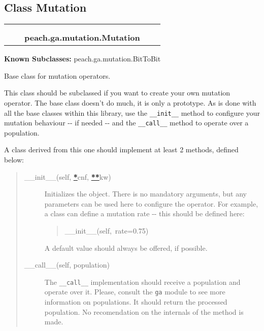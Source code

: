 
\subsection{Class Mutation}

    \label{peach:ga:mutation:Mutation}
\begin{tabular}{cccccc}
\multicolumn{2}{r}{\settowidth{\BCL}{object}\multirow{2}{\BCL}{object}}
&&
  \\\cline{3-3}
  &&\multicolumn{1}{c|}{}
&&
  \\
&&\multicolumn{2}{l}{\textbf{peach.ga.mutation.Mutation}}
\end{tabular}

\textbf{Known Subclasses:} peach.ga.mutation.BitToBit


Base class for mutation operators.

This class should be subclassed if you want to create your own mutation
operator. The base class doesn't do much, it is only a prototype. As is done
with all the base classes within this library, use the \texttt{\_\_init\_\_} method
to configure your mutation behaviour -{}- if needed -{}- and the \texttt{\_\_call\_\_}
method to operate over a population.

A class derived from this one should implement at least 2 methods, defined
below:
%
\begin{quote}
%
\begin{description}
\item[{\_\_init\_\_(self, %
\hyperlink{id1}{\textbf{\color{red}*}}cnf, %
\hyperlink{id3}{\textbf{\color{red}**}}kw)}] \leavevmode 
Initializes the object. There is no mandatory arguments, but any
parameters can be used here to configure the operator. For example, a
class can define a mutation rate -{}- this should be defined here:
%
\begin{quote}{\ttfamily \raggedright \noindent
\_\_init\_\_(self,~rate=0.75)
}
\end{quote}

A default value should always be offered, if possible.

\item[{\_\_call\_\_(self, population)}] \leavevmode 
The \texttt{\_\_call\_\_} implementation should receive a population and operate
over it. Please, consult the \texttt{ga} module to see more information on
populations. It should return the processed population. No recomendation
on the internals of the method is made.

\end{description}

\end{quote}


